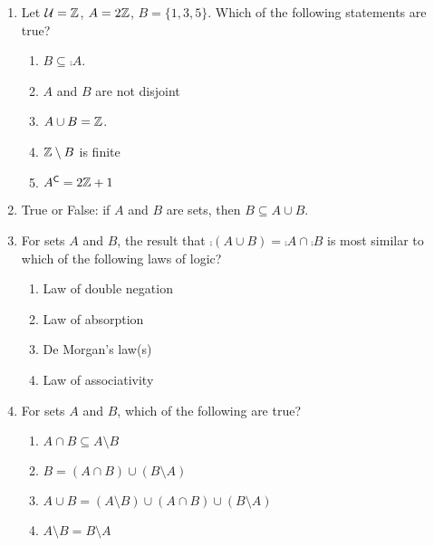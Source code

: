 \pagestyle{empty}


\begin{enumerate}
  \item Let $\mathcal{U}=\mathbb{Z}$, $A=2\mathbb{Z}$, $B=\{1,3,5\}$. Which of the following statements are true?
  \begin{enumerate}
    \item $B\subseteq\comp{A}$.
    \item $A$ and $B$ are not disjoint
    \item $A\cup B=\mathbb{Z}$.
    \item $\mathbb{Z}\setminus B$ is finite
    \item ${A}^{\mathsf{C}}=2\mathbb{Z}+1$
  \end{enumerate}
    
  \item True or False: if $A$ and $B$ are sets, then $B\subseteq A\cup B$.
    
  \item For sets $A$ and $B$, the result that $\comp{(A\cup B)} = \comp{A}\cap\comp{B}$ is most similar to which of the following laws of logic?
  \begin{enumerate}
    \item Law of double negation
    \item Law of absorption
    \item De Morgan's law(s)
    \item Law of associativity
  \end{enumerate}
    
  \item For sets $A$ and $B$, which of the following are true?
  \begin{enumerate}
    \item $A\cap B\subseteq A\setminus B$
    \item $B=(A\cap B)\cup(B\setminus A)$
    \item $A\cup B=(A\setminus B)\cup(A\cap B)\cup(B\setminus A)$
    \item $A\setminus B=B\setminus A$
  \end{enumerate}
  
\end{enumerate}



